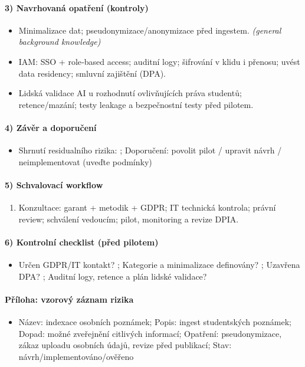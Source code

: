 \paragraph{3) Navrhovaná opatření (kontroly)}\begin{itemize}
\item Minimalizace dat; pseudonymizace/anonymizace před ingestem. \textit{(general background knowledge)}
\item IAM: SSO + role‑based access; auditní logy; šifrování v klidu i přenosu; uvést data residency; smluvní zajištění (DPA).
\item Lidská validace AI u rozhodnutí ovlivňujících práva studentů; retence/mazání; testy leakage a bezpečnostní testy před pilotem.
\end{itemize}
\paragraph{4) Závěr a doporučení}\begin{itemize}
\item Shrnutí residualního rizika: \underline{\hspace{6cm}}; Doporučení: povolit pilot / upravit návrh / neimplementovat (uveďte podmínky)
\end{itemize}
\paragraph{5) Schvalovací workflow}\begin{enumerate}
\item Konzultace: garant + metodik + GDPR; IT technická kontrola; právní review; schválení vedoucím; pilot, monitoring a revize DPIA.
\end{enumerate}
\paragraph{6) Kontrolní checklist (před pilotem)}\begin{itemize}
\item Určen GDPR/IT kontakt? \underline{\hspace{4cm}}; Kategorie a minimalizace definovány? \underline{\hspace{2cm}}; Uzavřena DPA? \underline{\hspace{2cm}}; Auditní logy, retence a plán lidské validace? \underline{\hspace{2cm}}
\end{itemize}
\paragraph{Příloha: vzorový záznam rizika}\begin{itemize}
\item Název: indexace osobních poznámek; Popis: ingest studentských poznámek; Dopad: možné zveřejnění citlivých informací; Opatření: pseudonymizace, zákaz uploadu osobních údajů, revize před publikací; Stav: návrh/implementováno/ověřeno
\end{itemize}